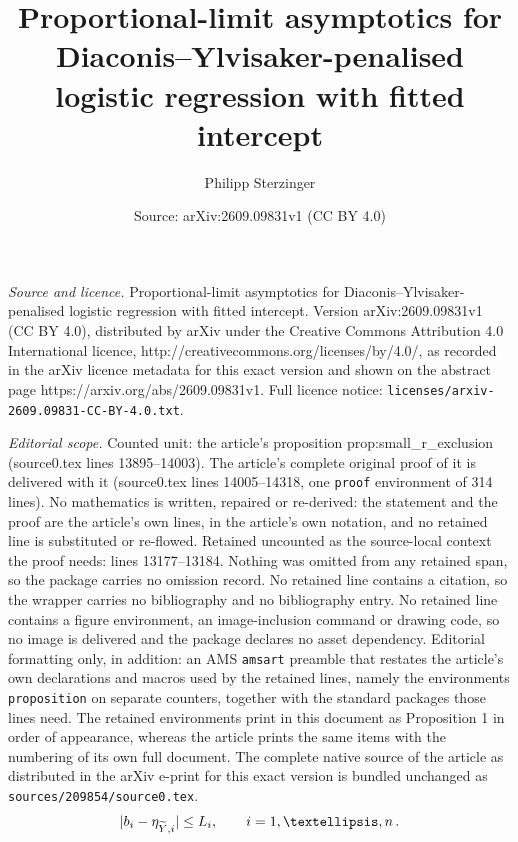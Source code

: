 \documentclass[10pt,a4paper]{amsart}
\title{Proportional-limit asymptotics for Diaconis--Ylvisaker-penalised logistic regression with fitted intercept}
\author{Philipp Sterzinger}
\date{Source: arXiv:2609.09831v1 (CC BY 4.0)}
\makeatletter
\def\Ytil{\widetilde{Y}}
\newcommand{\abs}[1]{%
	\ensuremath{%
		\if@display
		\left| #1 \right|
		\else
		\lvert #1 \rvert
		\fi
	}%
}
\makeatother
\begin{document}
\maketitle

\noindent\emph{Source and licence.} Proportional-limit asymptotics for Diaconis--Ylvisaker-penalised logistic regression with fitted intercept. Version arXiv:2609.09831v1 (CC BY 4.0), distributed by arXiv under the Creative Commons Attribution 4.0 International licence, http://creativecommons.org/licenses/by/4.0/, as recorded in the arXiv licence metadata for this exact version and shown on the abstract page https://arxiv.org/abs/2609.09831v1. Full licence notice: \texttt{licenses/arxiv-2609.09831-CC-BY-4.0.txt}.\par\smallskip

\noindent\textit{Editorial scope.} Counted unit: the article's proposition prop:small\_r\_exclusion (source0.tex lines 13895--14003). The article's complete original proof of it is delivered with it (source0.tex lines 14005--14318, one \texttt{proof} environment of 314 lines). No mathematics is written, repaired or re-derived: the statement and the proof are the article's own lines, in the article's own notation, and no retained line is substituted or re-flowed.  Retained uncounted as the source-local context the proof needs: lines 13177--13184.  Nothing was omitted from any retained span, so the package carries no omission record.  No retained line contains a citation, so the wrapper carries no bibliography and no bibliography entry.  No retained line contains a figure environment, an image-inclusion command or drawing code, so no image is delivered and the package declares no asset dependency.  Editorial formatting only, in addition: an AMS \texttt{amsart} preamble that restates the article's own declarations and macros used by the retained lines, namely the environments \texttt{proposition} on separate counters, together with the standard packages those lines need.  The retained environments print in this document as Proposition 1 in order of appearance, whereas the article prints the same items with the numbering of its own full document.  The complete native source of the article as distributed in the arXiv e-print for this exact version is bundled unchanged as \texttt{sources/209854/source0.tex}.
\begin{equation}
\label{eq:small_r_deterministic_envelope}
	\abs{b_i-\eta_{\Ytil,i}}
	\leq
	L_i,
	\qquad
	i=1,\ldots,n\,.
\end{equation}
\end{document}
